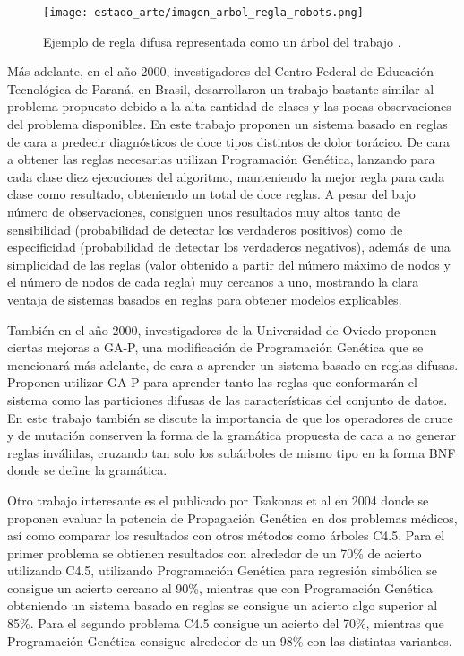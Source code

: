 \begin{figure}[H]
	\centering
	\texttt{[image: estado\_arte/imagen\_arbol\_regla\_robots.png]}
	\caption{Ejemplo de regla difusa representada como un árbol del trabajo \cite{PGcontrolRobots}.}
	\label{fig:imagen_arbol_regla_robots}
\end{figure}

Más adelante, en el año 2000, investigadores del Centro Federal de Educación Tecnológica de Paraná, en Brasil, desarrollaron un trabajo \cite{trabajoChestPain} bastante similar al problema propuesto debido a la alta cantidad de clases y las pocas observaciones del problema disponibles. En este trabajo proponen un sistema basado en reglas de cara a predecir diagnósticos de doce tipos distintos de dolor torácico. De cara a obtener las reglas necesarias utilizan Programación Genética, lanzando para cada clase diez ejecuciones del algoritmo, manteniendo la mejor regla para cada clase como resultado, obteniendo un total de doce reglas. A pesar del bajo número de observaciones, consiguen unos resultados muy altos tanto de sensibilidad (probabilidad de detectar los verdaderos positivos) como de especificidad (probabilidad de detectar los verdaderos negativos), además de una simplicidad de las reglas (valor obtenido a partir del número máximo de nodos y el número de nodos de cada regla) muy cercanos a uno, mostrando la clara ventaja de sistemas basados en reglas para obtener modelos explicables.

También en el año 2000, investigadores de la Universidad de Oviedo proponen \cite{GAPnichosFuzzyRules} ciertas mejoras a GA-P, una modificación de Programación Genética que se mencionará más adelante, de cara a aprender un sistema basado en reglas difusas. Proponen utilizar GA-P para aprender tanto las reglas que conformarán el sistema como las particiones difusas de las características del conjunto de datos. En este trabajo también se discute la importancia de que los operadores de cruce y de mutación conserven la forma de la gramática propuesta de cara a no generar reglas inválidas, cruzando tan solo los subárboles de mismo tipo en la forma BNF donde se define la gramática.

Otro trabajo interesante es el publicado por Tsakonas et al en 2004 \cite{reglasDosDominiosMedicosComparacion} donde se proponen evaluar la potencia de Propagación Genética en dos problemas médicos, así como comparar los resultados con otros métodos como árboles C4.5. Para el primer problema se obtienen resultados con alrededor de un 70\% de acierto utilizando C4.5, utilizando Programación Genética para regresión simbólica se consigue un acierto cercano al 90\%, mientras que con Programación Genética obteniendo un sistema basado en reglas se consigue un acierto algo superior al 85\%. Para el segundo problema C4.5 consigue un acierto del 70\%, mientras que Programación Genética consigue alrededor de un 98\% con las distintas variantes.

